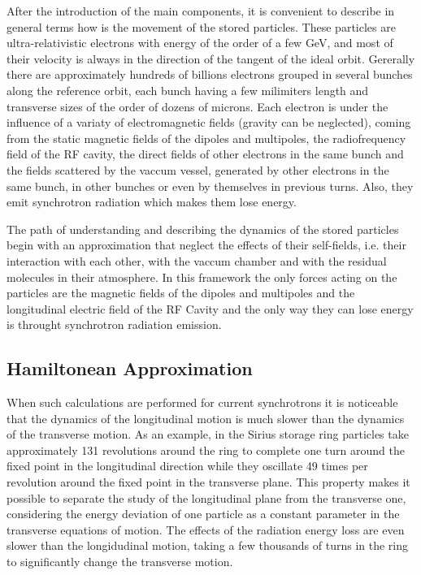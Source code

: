 \documentclass[
	12pt,				%
	openright,			%
	oneside,			%
	a4paper,		%
	chapter=TITLE,		%
	section=TITLE,		%
    brazil,				%
	english,			%
	sumario=tradicional,
	]{abntex2}
\begin{document}
  After the introduction of the main components, it is convenient to describe in general terms how is the movement of the stored particles. These particles are ultra-relativistic electrons with energy of the order of a few \si{GeV}, and most of their velocity is always in the direction of the tangent of the ideal orbit. Gererally there are approximately hundreds of billions electrons grouped in several bunches along the reference orbit, each bunch having a few milimiters length and transverse sizes of the order of dozens of microns. Each electron is under the influence of a variaty of electromagnetic fields (gravity can be neglected), coming from the static magnetic fields of the dipoles and multipoles, the radiofrequency field of the RF cavity, the direct fields of other electrons in the same bunch and the fields scattered by the vaccum vessel, generated by other electrons in the same bunch, in other bunches or even by themselves in previous turns. Also, they emit synchrotron radiation which makes them lose energy.

  The path of understanding and describing the dynamics of the stored particles begin with an approximation that neglect the effects of their self-fields, i.e. their interaction with each other, with the vaccum chamber and with the residual molecules in their atmosphere. In this framework the only forces acting on the particles are the magnetic fields of the dipoles and multipoles and the longitudinal electric field of the RF Cavity and the only way they can lose energy is throught synchrotron radiation emission.

    \subsection{Hamiltonean Approximation}

    When such calculations are performed for current synchrotrons it is noticeable that the dynamics of the longitudinal motion is much slower than the dynamics of the transverse motion. As an example, in the Sirius storage ring particles take approximately 131 revolutions around the ring to complete one turn around the fixed point in the longitudinal direction while they oscillate 49 times per revolution around the fixed point in the transverse plane. This property makes it possible to separate the study of the longitudinal plane from the transverse one, considering the energy deviation of one particle as a constant parameter in the transverse equations of motion. The effects of the radiation energy loss are even slower than the longidudinal motion, taking a few thousands of turns in the ring to significantly change the transverse motion.
\end{document}

